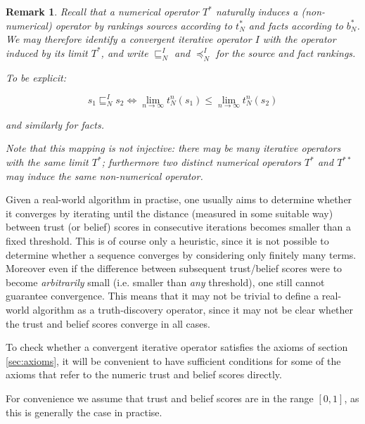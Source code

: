 \documentclass{article}
\theoremstyle{definition} \newtheorem{definition}{Definition}
\theoremstyle{definition} \newtheorem{example}{Example}
\theoremstyle{plain} \newtheorem{axiom}{Axiom}
\theoremstyle{plain} \newtheorem*{remark}{Remark}
\theoremstyle{remark} \newtheorem*{notation}{Notation}
\theoremstyle{plain} \newtheorem{lemma}{Lemma}
\theoremstyle{plain} \newtheorem{theorem}{Theorem}
\theoremstyle{plain} \newtheorem{proposition}{Proposition}
\newcommand{\sle}{\sqsubseteq}
\newcommand{\fle}{\preceq}
\begin{document}
\begin{remark}
Recall that a numerical operator $T^*$ naturally induces a (non-numerical)
operator by rankings sources according to $t_N^*$ and facts according to
$b_N^*$. We may therefore identify a convergent iterative operator $I$ with the
operator induced by its limit $T^*$, and write $\sle_N^I$ and $\fle_N^I$ for
the source and fact rankings.

To be explicit:

$$ s_1 \sle_N^I s_2 \iff \lim_{n \rightarrow \infty}{t_N^n(s_1)} \le \lim_{n
\rightarrow \infty}{t_N^n(s_2)} $$

and similarly for facts.

Note that this mapping is not injective: there may be many iterative operators
with the same limit $T^*$; furthermore two distinct numerical operators $T^*$
and $T^{**}$ may induce the same non-numerical operator.
\end{remark}

Given a real-world algorithm in practise, one usually aims to determine whether
it converges by iterating until the distance (measured in some suitable way)
between trust (or belief) scores in consecutive iterations becomes smaller than
a fixed threshold. This is of course only a heuristic, since it is not possible
to determine whether a sequence converges by considering only finitely many
terms. Moreover even if the difference between subsequent trust/belief scores
were to become \emph{arbitrarily} small (i.e. smaller than \emph{any}
threshold), one still cannot guarantee convergence\footnotemark. This means
that it may not be trivial to define a real-world algorithm as a
truth-discovery operator, since it may not be clear whether the trust and
belief scores converge in all cases.


To check whether a convergent iterative operator satisfies the axioms of section
\ref{sec:axioms}, it will be convenient to have sufficient conditions for some
of the axioms that refer to the numeric trust and belief scores directly.

For convenience we assume that trust and belief scores are in the range $[0,
1]$, as this is generally the case in practise.
\end{document}
